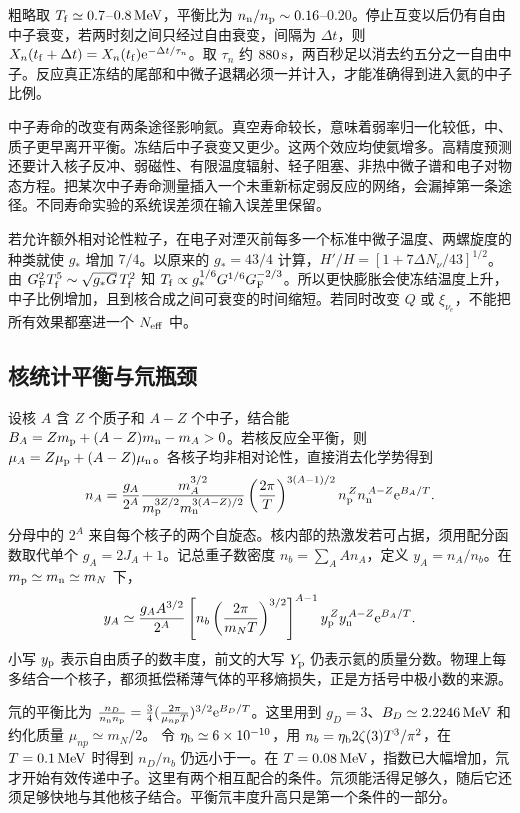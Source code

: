 粗略取 $T_{\rm f}\simeq0.7$--$0.8\,{\rm MeV}$，平衡比为 $n_{\rm n}/n_{\rm p}\sim0.16$--$0.20$。停止互变以后仍有自由中子衰变，若两时刻之间只经过自由衰变，间隔为 $\Delta t$，则 $X_n(t_{\rm f}+\Delta t)=X_n(t_{\rm f})\mathrm{e}^{-\Delta t/\tau_n}$。取 $\tau_n$ 约 $880\,{\rm s}$，两百秒足以消去约五分之一自由中子。反应真正冻结的尾部和中微子退耦必须一并计入，才能准确得到进入氦的中子比例。

中子寿命的改变有两条途径影响氦。真空寿命较长，意味着弱率归一化较低，中、质子更早离开平衡。冻结后中子衰变又更少。这两个效应均使氦增多。高精度预测还要计入核子反冲、弱磁性、有限温度辐射、轻子阻塞、非热中微子谱和电子对物态方程。把某次中子寿命测量插入一个未重新标定弱反应的网络，会漏掉第一条途径。不同寿命实验的系统误差须在输入误差里保留。

若允许额外相对论性粒子，在电子对湮灭前每多一个标准中微子温度、两螺旋度的种类就使 $g_*$ 增加 $7/4$。以原来的 $g_*=43/4$ 计算，$H'/H=[1+7\Delta N_\nu/43]^{1/2}$。由 $G_{\rm F}^2T_{\rm f}^5\sim\sqrt{g_*G}\,T_{\rm f}^2$ 知 $T_{\rm f}\propto g_*^{1/6}G^{1/6}G_{\rm F}^{-2/3}$。所以更快膨胀会使冻结温度上升，中子比例增加，且到核合成之间可衰变的时间缩短。若同时改变 $Q$ 或 $\xi_{\nu_e}$，不能把所有效果都塞进一个 $N_{\rm eff}$ 中。

\subsection{核统计平衡与氘瓶颈}

设核 $A$ 含 $Z$ 个质子和 $A-Z$ 个中子，结合能 $B_A=Zm_{\rm p}+(A-Z)m_{\rm n}-m_A>0$。若核反应全平衡，则 $\mu_A=Z\mu_{\rm p}+(A-Z)\mu_{\rm n}$。各核子均非相对论性，直接消去化学势得到
\begin{equation}\label{eq:cosmo-nse}
 n_A=\frac{g_A}{2^A}
 \frac{m_A^{3/2}}{m_{\rm p}^{3Z/2}m_{\rm n}^{3(A-Z)/2}}
 \left(\frac{2\pi}{T}\right)^{3(A-1)/2}
 n_{\rm p}^{\,Z}n_{\rm n}^{\,A-Z}\mathrm{e}^{B_A/T}.
\end{equation}
分母中的 $2^A$ 来自每个核子的两个自旋态。核内部的热激发若可占据，须用配分函数取代单个 $g_A=2J_A+1$。记总重子数密度 $n_b=\sum_A A n_A$，定义 $y_A=n_A/n_b$。在 $m_{\rm p}\simeq m_{\rm n}\simeq m_N$ 下，
\[
 y_A\simeq\frac{g_A A^{3/2}}{2^A}
 \left[n_b\left(\frac{2\pi}{m_N T}\right)^{3/2}\right]^{A-1}
 y_{\rm p}^{\,Z}y_{\rm n}^{\,A-Z}\mathrm{e}^{B_A/T}.
\]
小写 $y_{\rm p}$ 表示自由质子的数丰度，前文的大写 $Y_{\rm p}$ 仍表示氦的质量分数。物理上每多结合一个核子，都须抵偿稀薄气体的平移熵损失，正是方括号中极小数的来源。

氘的平衡比为 $\frac{n_D}{n_{\rm n}n_{\rm p}}=\frac34(\frac{2\pi}{\mu_{np}T})^{3/2}\mathrm{e}^{B_D/T}$。这里用到 $g_D=3$、$B_D\simeq2.2246\,{\rm MeV}$ 和约化质量 $\mu_{np}\simeq m_N/2$。
令 $\eta_{\rm b}\simeq6\times10^{-10}$，用 $n_b=\eta_{\rm b}2\zeta(3)T^3/\pi^2$，在 $T=0.1\,{\rm MeV}$ 时得到 $n_D/n_b$ 仍远小于一。在 $T=0.08\,{\rm MeV}$，指数已大幅增加，氘才开始有效传递中子。这里有两个相互配合的条件。氘须能活得足够久，随后它还须足够快地与其他核子结合。平衡氘丰度升高只是第一个条件的一部分。

